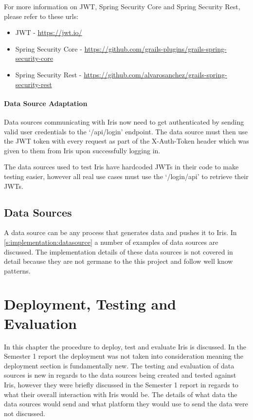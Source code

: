 \documentclass[12pt,a4paper,titlepage]{report}
\begin{document}
For more information on JWT, Spring Security Core and Spring Security Rest, please refer to these urls:
\begin{itemize}
    \item JWT - \url{https://jwt.io/}
    \item Spring Security Core - \url{https://github.com/grails-plugins/grails-spring-security-core}
    \item Spring Security Rest - \url{https://github.com/alvarosanchez/grails-spring-security-rest}
\end{itemize}


\subsubsection{Data Source Adaptation}
Data sources communicating with Iris now need to get authenticated by sending valid user credentials to the `/api/login' endpoint. The data source must then use the JWT token with every request as part of the X-Auth-Token header which was given to them from Iris upon successfully logging in.

The data sources used to test Iris have hardcoded JWTs in their code to make testing easier, however all real use cases must use the `/login/api' to retrieve their JWTs.

\section{Data Sources}
A data source can be any process that generates data and pushes it to Iris. In \cref{s:implementation:datasource}
a number of examples of data sources are discussed. The implementation details of these data sources is not covered in detail because they are not germane to the this project and follow well know patterns.

\chapter{Deployment, Testing and Evaluation}
In this chapter the procedure to deploy, test and evaluate Iris is discussed. In the Semester 1 report the deployment was not taken into consideration meaning the deployment section is fundamentally new. The testing and evaluation of data sources is new in regards to the data sources being created and tested against Iris, however they were briefly discussed in the Semester 1 report in regards to what their overall interaction with Iris would be. The details of what data the data sources would send and what platform they would use to send the data were not discussed.
\end{document}
